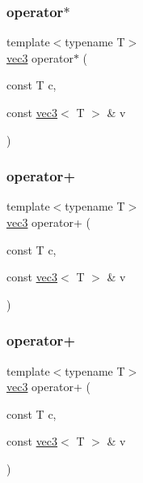 \subsubsection{\texorpdfstring{operator$\ast$}{operator*}\hspace{0.1cm}{\footnotesize\ttfamily [3/3]}}
{\footnotesize\ttfamily template$<$typename T$>$ \\
\mbox{\hyperlink{struct_space_h_1_1vec3}{vec3}} operator$\ast$ (\begin{DoxyParamCaption}\item[{const T}]{c,  }\item[{const \mbox{\hyperlink{struct_space_h_1_1vec3}{vec3}}$<$ T $>$ \&}]{v }\end{DoxyParamCaption})\hspace{0.3cm}{\ttfamily [friend]}}

\mbox{\label{struct_space_h_1_1vec3_a04165a00cae4ce5d2f5e142cc177a720}} 
\subsubsection{\texorpdfstring{operator+}{operator+}\hspace{0.1cm}{\footnotesize\ttfamily [1/3]}}
{\footnotesize\ttfamily template$<$typename T$>$ \\
\mbox{\hyperlink{struct_space_h_1_1vec3}{vec3}} operator+ (\begin{DoxyParamCaption}\item[{const T}]{c,  }\item[{const \mbox{\hyperlink{struct_space_h_1_1vec3}{vec3}}$<$ T $>$ \&}]{v }\end{DoxyParamCaption})\hspace{0.3cm}{\ttfamily [friend]}}

\mbox{\label{struct_space_h_1_1vec3_a04165a00cae4ce5d2f5e142cc177a720}} 
\subsubsection{\texorpdfstring{operator+}{operator+}\hspace{0.1cm}{\footnotesize\ttfamily [2/3]}}
{\footnotesize\ttfamily template$<$typename T$>$ \\
\mbox{\hyperlink{struct_space_h_1_1vec3}{vec3}} operator+ (\begin{DoxyParamCaption}\item[{const T}]{c,  }\item[{const \mbox{\hyperlink{struct_space_h_1_1vec3}{vec3}}$<$ T $>$ \&}]{v }\end{DoxyParamCaption})\hspace{0.3cm}{\ttfamily [friend]}}

